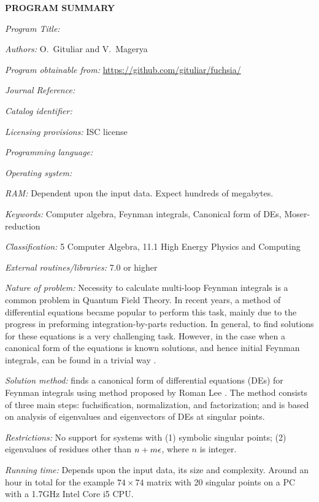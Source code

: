 {\bf PROGRAM SUMMARY}

\begin{small}
\noindent

{\em Program Title:}
    \fuchsia{}

{\em Authors:}
    O.~Gituliar and V.~Magerya

{\em Program obtainable from:}
    \url{https://github.com/gituliar/fuchsia/}

{\em Journal Reference:}

{\em Catalog identifier:}

{\em Licensing provisions:}
    ISC license

{\em Programming language:}

{\em Operating system:}
    \linux

{\em RAM:}
    Dependent upon the input data. Expect hundreds of megabytes.

{\em Keywords:}
    Computer algebra, Feynman integrals, Canonical form of DEs, Moser-reduction

{\em Classification:}
    5 Computer Algebra, 11.1 High Energy Physics and Computing

{\em External routines/libraries:}
    \href{http://www.sagemath.org/}{\sage} 7.0 or higher

{\em Nature of problem:}
    Necessity to calculate multi-loop Feynman integrals is a common problem in Quantum Field Theory.
    In recent years, a method of differential equations became popular to perform this task, mainly due to the progress in preforming integration-by-parts reduction.
    In general, to find solutions for these equations is a very challenging task.
    However, in the case when a canonical form of the equations is known solutions, and hence initial Feynman integrals, can be found in a trivial way \cite{Henn13}.

{\em Solution method:}
    \fuchsia finds a canonical form of differential equations (DEs) for Feynman integrals using method proposed by Roman Lee \cite{Lee15}.
    The method consists of three main steps: fuchsification, normalization, and factorization; and is based on analysis of eigenvalues and eigenvectors of DEs at singular points.

{\em Restrictions:}
    No support for systems with (1) symbolic singular points; (2) eigenvalues of residues other than $n + m \epsilon$, where $n$ is integer.

{\em Running time:}
    Depends upon the input data, its size and complexity.
    Around an hour in total for the example $74\times74$ matrix with 20 singular points on a PC with a 1.7GHz Intel Core i5 CPU.

\end{small}
